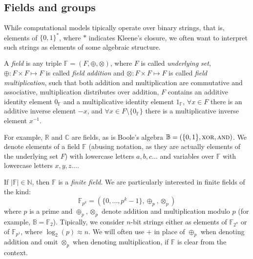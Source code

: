 \subsection{Fields and groups}
While computational models tipically operate over binary strings, that is, elements of
\({\{0, 1\}}^*\), where \(*\) indicates Kleene's closure, we often want to interpret such strings
as elements of some algebraic structure.
\begin{definition}
	A \emph{field} is any triple \(\mathbb{F} = (F, \oplus, \otimes)\), where \(F\) is called
	\emph{underlying set}, \(\oplus\colon F \times F \mapsto F\) is called \emph{field addition} and
	\(\otimes\colon F \times F \mapsto F\) is called \emph{field multiplication}, such that both
	addition and multiplication are commutative and associative, multiplication
	distributes over addition, \(F\) contains an additive identity element \(0_{\mathbb{F}}\) and a
	multiplicative identity element \(1_{\mathbb{F}}\), \(\forall x \in F\) there is an additive inverse
	element \(-x\), and \(\forall x \in F\setminus \{0_{\mathbb{F}}\} \) there is a multiplicative
	inverse
	element \(x^{-1}\).
\end{definition}

\noindent For example, \(\mathbb{R}\) and \(\mathbb{C}\) are fields, as is Boole's algebra
\(\mathbb{B} = (\{0, 1\}, \textsc{xor}, \textsc{and})\).
We denote elements of a field \(\mathbb{F}\) (abusing notation, as they are actually
elements of the underlying set \(F\)) with lowercase letters \(a, b, c\dots \) and variables over
\(\mathbb{F}\) with lowercase letters \(x, y, z\dots \).

If \(|\mathbb{F}| \in \mathbb{N}\), then \(\mathbb{F}\) is a \emph{finite field}.
We are particularly interested in finite fields of the kind:
\[\mathbb{F}_{p^k} = (\{0, \dots, p^k-1\}, \oplus_p, \otimes_p)\]
where \(p\) is a prime and \(\oplus_p, \otimes_p\) denote addition and
multiplication modulo \(p\) (for example, \(\mathbb{B} = \mathbb{F}_2\)).
Tipically, we consider \(n\)-bit strings either as elements of \(\mathbb{F}_{2^n}\) or of
\(\mathbb{F}_{p^1}\), where \(\log_2(p) \approx n\).
We will often use \(+\) in place of \(\oplus_p \) when denoting addition and omit \(\otimes_p \)
when denoting multiplication, if \(\mathbb{F}\) is clear from the context.

